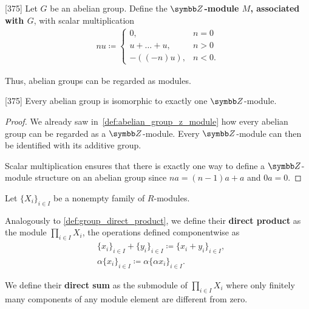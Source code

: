 \begin{definition}\label{def:abelian_group_z_module}\cite{Knapp2016BAlg}[375]
  Let \( G \) be an abelian group. Define the \textbf{\( \BB{Z} \)-module \( M \), associated with \( G \)}, with scalar multiplication
  \begin{align*}
    nu \coloneqq \begin{cases}
      0, &n = 0 \\
      u + \ldots + u, &n > 0 \\
      -((-n)u), &n < 0.
    \end{cases}
  \end{align*}

  Thus, abelian groups can be regarded as modules.
\end{definition}

\begin{proposition}\label{thm:abelian_group_iff_z_module}\cite{Knapp2016BAlg}[375]
  Every abelian group is isomorphic to exactly one \( \BB{Z} \)-module.
\end{proposition}
\begin{proof}
  We already saw in~\cref{def:abelian_group_z_module} how every abelian group can be regarded as a \( \BB{Z} \)-module. Every \( \BB{Z} \)-module can then be identified with its additive group.

  Scalar multiplication ensures that there is exactly one way to define a \( \BB{Z} \)-module structure on an abelian group since \( na = (n-1)a + a \) and \( 0a = 0 \).
\end{proof}

\begin{definition}\label{def:module_direct_product}
  Let \( \{ X_i \}_{i \in I} \) be a nonempty family of \( R \)-modules.

  Analogously to \cref{def:group_direct_product}, we define their \textbf{direct product} as the module \( \prod_{i \in I} X_i \), the operations defined componentwise as
  \begin{align*}
    &\{ x_i \}_{i \in I} + \{ y_i \}_{i \in I}
    \coloneqq
    \{ x_i + y_i \}_{i \in I}, \\
    &\alpha \{ x_i \}_{i \in I}
    \coloneqq
    \alpha \{ \alpha x_i \}_{i \in I}.
  \end{align*}

  We define their \textbf{direct sum} as the submodule of \( \prod_{i \in I} X_i \) where only finitely many components of any module element are different from zero.
\end{definition}

